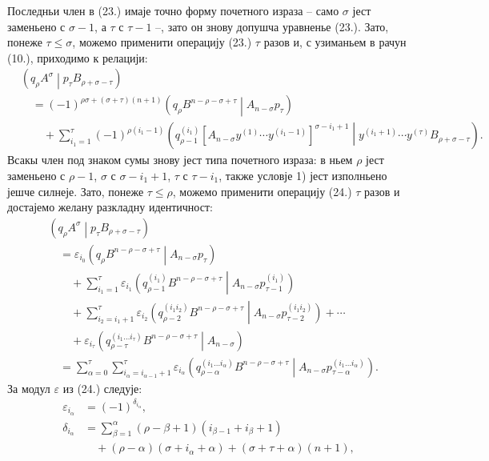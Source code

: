 \documentclass[11pt]{article}
\newcommand{\pair}[2]{\left(#1\middle|#2\right)}
\newcommand{\eps}{\varepsilon}
\begin{document}
Последньи член в (23.) имаје точно форму почетного израза -- само $\sigma$ јест заменьено с $\sigma-1$, а $\tau$ с $\tau-1$ --, зато он знову допушча уравненье (23.). Зато, понеже $\tau\le\sigma$, можемо применити операцију (23.) $\tau$ разов и, с узиманьем в рачун (10.), приходимо к релацији:
\begin{equation}
\begin{aligned}
&\pair{q_\rho A^\sigma}{p_\tau B_{\rho+\sigma-\tau}}\\
&\quad=(-1)^{\rho\sigma+(\sigma+\tau)(n+1)}
\pair{q_\rho B^{n-\rho-\sigma+\tau}}{A_{n-\sigma}p_\tau}\\
&\qquad+\sum_{i_1=1}^{\tau}(-1)^{\rho(i_1-1)}
\pair{q_{\rho-1}^{(i_1)}
[A_{n-\sigma}y^{(1)}\cdots y^{(i_1-1)}]^{\sigma-i_1+1}}
{y^{(i_1+1)}\cdots y^{(\tau)}B_{\rho+\sigma-\tau}}.
\end{aligned}
\tag{24}
\end{equation}
Всакы член под знаком сумы знову јест типа почетного израза: в ньем $\rho$ јест заменьено с $\rho-1$, $\sigma$ с $\sigma-i_1+1$, $\tau$ с $\tau-i_1$, также условје 1) јест изполньено јешче силнеје. Зато, понеже $\tau\le\rho$, можемо применити операцију (24.) $\tau$ разов и достајемо желану разкладну идентичност:
\begin{equation}
\begin{aligned}
&\pair{q_\rho A^\sigma}{p_\tau B_{\rho+\sigma-\tau}}\\
&\quad=\eps_{i_0}\pair{q_\rho B^{n-\rho-\sigma+\tau}}
{A_{n-\sigma}p_\tau}\\
&\qquad+\sum_{i_1=1}^{\tau}\eps_{i_1}
\pair{q_{\rho-1}^{(i_1)}B^{n-\rho-\sigma+\tau}}
{A_{n-\sigma}p_{\tau-1}^{(i_1)}}\\
&\qquad+\sum_{i_2=i_1+1}^{\tau}\eps_{i_2}
\pair{q_{\rho-2}^{(i_1i_2)}B^{n-\rho-\sigma+\tau}}
{A_{n-\sigma}p_{\tau-2}^{(i_1i_2)}}+\cdots\\
&\qquad+\eps_{i_\tau}
\pair{q_{\rho-\tau}^{(i_1\ldots i_\tau)}B^{n-\rho-\sigma+\tau}}
{A_{n-\sigma}}\\
&\quad=\sum_{\alpha=0}^{\tau}
\sum_{i_\alpha=i_{\alpha-1}+1}^{\tau}\eps_{i_\alpha}
\pair{q_{\rho-\alpha}^{(i_1\ldots i_\alpha)}B^{n-\rho-\sigma+\tau}}
{A_{n-\sigma}p_{\tau-\alpha}^{(i_1\ldots i_\alpha)}}.
\end{aligned}
\tag{25}
\end{equation}
За модул $\eps$ из (24.) следује:
\begin{equation}
\begin{aligned}
\eps_{i_\alpha}&=(-1)^{\delta_{i_\alpha}},\\
\delta_{i_\alpha}
&=\sum_{\beta=1}^{\alpha}(\rho-\beta+1)(i_{\beta-1}+i_\beta+1)\\
&\quad+(\rho-\alpha)(\sigma+i_\alpha+\alpha)
+(\sigma+\tau+\alpha)(n+1),
\end{aligned}
\tag{26}
\end{equation}
\end{document}
